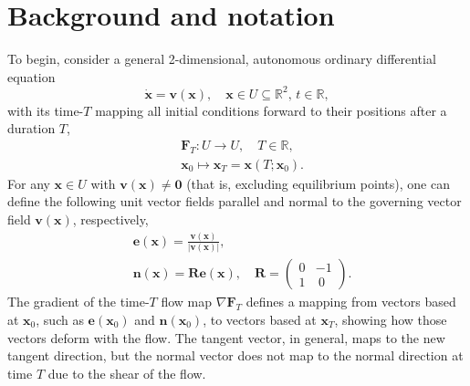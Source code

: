 \documentclass[twocolumn]{svjour3}
\begin{document}
\section{Background and notation}\label{s:Background}
To begin, consider a general 2-dimensional, autonomous ordinary differential equation
\begin{equation}
\mathbf{\dot x} = \mathbf{v}(\mathbf{x}), \quad \mathbf{x} \in U \subseteq \mathbb{R}^2, \, t\in \mathbb{R},
\end{equation}
with its time-$T$ mapping all initial conditions forward to their positions after a duration $T$,
\begin{equation}\label{eq:flowmap}
\begin{split}
& \mathbf{F}_T : U \rightarrow U, \quad T \in \mathbb{R}, \\
& \mathbf{x}_0 \mapsto \mathbf{x}_T = \mathbf{x}(T;\mathbf{x}_0).
\end{split}
\end{equation}
For any $\mathbf{x} \in U$ with $\mathbf{v}(\mathbf{x}) \ne \mathbf{0}$ (that is, excluding equilibrium points), one can define the following unit vector fields parallel and normal to the governing vector field $\mathbf{v}(\mathbf{x})$, respectively,
\begin{equation}
\begin{split}
& \mathbf{e}(\mathbf{x}) = \frac{\mathbf{v}(\mathbf{x})}{|\mathbf{v}(\mathbf{x})|}, \\
& \mathbf{n}(\mathbf{x}) = \mathbf{R} \mathbf{e}(\mathbf{x})
, \quad   
\mathbf{R} = \left(
\begin{array}{cc}
0 & -1 \\
1 & ~ 0 
\end{array}
\right).
\end{split}
\label{unit_vector_fields}
\end{equation}
The gradient of the time-$T$ flow map $\nabla\mathbf{F}_T$ defines a mapping from vectors based at $\mathbf{x}_0$, such as $\mathbf{e}(\mathbf{x}_0)$ and $\mathbf{n}(\mathbf{x}_0)$, to vectors based at $\mathbf{x}_T$, showing how those vectors deform with the flow. The tangent vector, in general, maps to the new tangent direction, but the normal vector does not map to the normal direction at time $T$ due to the shear of the flow.
\end{document}
